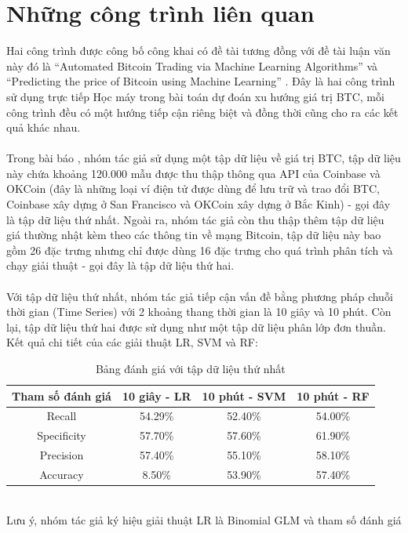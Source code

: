 \chapter{Những công trình liên quan}
Hai công trình được công bố công khai có đề tài tương đồng với đề tài luận văn này đó là 
``Automated Bitcoin Trading via Machine Learning Algorithms'' \cite{AutomatedBitcoinTrading}
và ``Predicting the price of Bitcoin using Machine Learning'' \cite{PredictingThePriceOfBitcoin}.
Đây là hai công trình sử dụng trực tiếp Học máy trong bài toán dự đoán xu hướng 
giá trị BTC, mỗi công trình đều có một hướng tiếp cận riêng biệt và đồng thời 
cũng cho ra các kết quả khác nhau.\\\\
Trong bài báo \cite{AutomatedBitcoinTrading}, nhóm tác giả sử dụng một tập dữ 
liệu về giá trị BTC, tập dữ liệu này chứa khoảng 120.000 mẫu được thu thập thông 
qua API của Coinbase và OKCoin (đây là những loại ví điện tử được dùng để lưu 
trữ và trao đổi BTC, Coinbase xây dựng ở San Francisco và OKCoin xây dựng ở Bắc 
Kinh) - gọi đây là tập dữ liệu thứ nhất. Ngoài ra, nhóm tác giả còn thu thập 
thêm tập dữ liệu giá thường nhật kèm theo các thông tin về mạng Bitcoin, tập dữ 
liệu này bao gồm 26 đặc trưng nhưng chỉ được dùng 16 đặc trưng cho quá trình 
phân tích và chạy giải thuật - gọi đây là tập dữ liệu thứ hai.\\\\
Với tập dữ liệu thứ nhất, nhóm tác giả tiếp cận vấn đề bằng phương pháp chuỗi 
thời gian (Time Series) với 2 khoảng thang thời gian là 10 giây và 10 phút. Còn 
lại, tập dữ liệu thứ hai được sử dụng như một tập dữ liệu phân lớp đơn thuần.
Kết quả chi tiết của các giải thuật LR, SVM và RF:
\begin{table}[h]
\centering
\begin{tabular}{ |c|c|c|c| }
\hline
Tham số đánh giá & 10 giây - LR & 10 phút - SVM & 10 phút - RF \\
\hline
Recall & 54.29\% & 52.40\% & 54.00\% \\
\hline
Specificity & 57.70\% & 57.60\% & 61.90\% \\
\hline
Precision & 57.40\% & 55.10\% & 58.10\% \\
\hline
Accuracy & 8.50\% & 53.90\% & 57.40\% \\
\hline
\end{tabular}
\caption{Bảng đánh giá với tập dữ liệu thứ nhất}
\end{table}\\
Lưu ý, nhóm tác giả ký hiệu giải thuật LR là Binomial GLM và tham số đánh giá 
